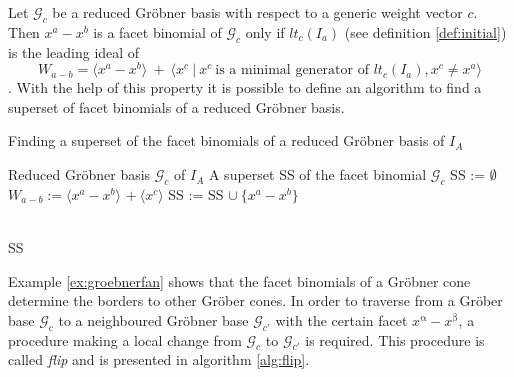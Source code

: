 Let $\mathcal{G}_{c} $ be a reduced Gröbner basis with respect to a generic weight vector $c$. Then $x^{a} - x^{b}$ is a facet binomial of $\mathcal{G}_{c}$ only if $lt_{c}(I_{a})$ (see definition \ref{def:initial}) is the leading ideal of \[W_{a - b} = \langle x^{a}-x^{b}\rangle~+~ \langle x^{c}~|~x^{c}~\textrm{is a minimal generator of~} lt_{c}(I_{a}), x^{c} \neq x^{a} \rangle \] \cite{tigers}.
With the help of this property it is possible to define an algorithm to find a superset of facet binomials of a reduced Gröbner basis.

\begin{algorithm}
\caption{Finding a superset of the facet binomials
of a reduced Gröbner basis of $I_A$ \cite{tigers}}
\label{alg:facetSS}
\begin{algorithmic}[1]

\Input
Reduced Gröbner basis $ \mathcal{G}_{c} $ of $I_A$
\Output A superset SS of the facet binomial $\mathcal{G}_{c}$
\State SS := $\emptyset$
\State $W_{a - b} := \langle x^{a}-x^{b}\rangle$
$+~ \langle x^{c} \rangle$ 
\State SS := SS $\cup~ \{x^{a}-x^{b} \}$

\EndIf
\EndFor \\
\Return SS

\end{algorithmic}
\end{algorithm}
 

Example \ref{ex:groebnerfan} shows that the facet binomials of a Gröbner cone determine the borders to other Gröber cones.
In order to traverse from a Gröber base $\mathcal{G}_c$ to a neighboured Gröbner base $\mathcal{G}_{c'}$ with the certain facet $x^{\upalpha}-x^{\upbeta} $, a procedure making a local change from $\mathcal{G}_c$ to $\mathcal{G}_{c'}$ is required.
This procedure is called \textit{flip} and is presented in algorithm \ref{alg:flip}. 
\newpage



